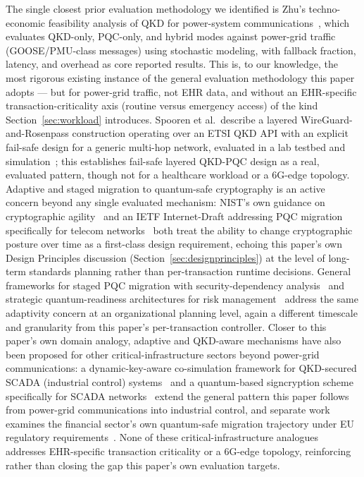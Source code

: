 \documentclass[journal]{IEEEtran}
\begin{document}
The single closest prior evaluation methodology we identified is Zhu's techno-economic feasibility analysis of QKD for power-system communications~\cite{zhu2025technoeconomic}, which evaluates QKD-only, PQC-only, and hybrid modes against power-grid traffic (GOOSE/PMU-class messages) using stochastic modeling, with fallback fraction, latency, and overhead as core reported results. This is, to our knowledge, the most rigorous existing instance of the general evaluation methodology this paper adopts --- but for power-grid traffic, not EHR data, and without an EHR-specific transaction-criticality axis (routine versus emergency access) of the kind Section~\ref{sec:workload} introduces. Spooren et al.\ describe a layered WireGuard-and-Rosenpass construction operating over an ETSI QKD API with an explicit fail-safe design for a generic multi-hop network, evaluated in a lab testbed and simulation~\cite{spooren2026pqcenhanced}; this establishes fail-safe layered QKD-PQC design as a real, evaluated pattern, though not for a healthcare workload or a 6G-edge topology. Adaptive and staged migration to quantum-safe cryptography is an active concern beyond any single evaluated mechanism: NIST's own guidance on cryptographic agility~\cite{nist2025cryptoagility} and an IETF Internet-Draft addressing PQC migration specifically for telecom networks~\cite{ietf2026telecompqc} both treat the ability to change cryptographic posture over time as a first-class design requirement, echoing this paper's own Design Principles discussion (Section~\ref{sec:designprinciples}) at the level of long-term standards planning rather than per-transaction runtime decisions. General frameworks for staged PQC migration with security-dependency analysis~\cite{pqcmigrationframework2023} and strategic quantum-readiness architectures for risk management~\cite{quasar2025} address the same adaptivity concern at an organizational planning level, again a different timescale and granularity from this paper's per-transaction controller. Closer to this paper's own domain analogy, adaptive and QKD-aware mechanisms have also been proposed for other critical-infrastructure sectors beyond power-grid communications: a dynamic-key-aware co-simulation framework for QKD-secured SCADA (industrial control) systems~\cite{scadacosim2025} and a quantum-based signcryption scheme specifically for SCADA networks~\cite{scadasigncryption2022} extend the general pattern this paper follows from power-grid communications into industrial control, and separate work examines the financial sector's own quantum-safe migration trajectory under EU regulatory requirements~\cite{financialquantumsafe2025}. None of these critical-infrastructure analogues addresses EHR-specific transaction criticality or a 6G-edge topology, reinforcing rather than closing the gap this paper's own evaluation targets.
\end{document}
